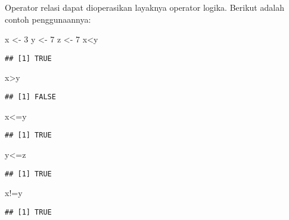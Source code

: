 \documentclass[
]{book}
\newenvironment{Shaded}{\begin{snugshade}}{\end{snugshade}}
\newcommand{\DecValTok}[1]{\textcolor[rgb]{0.00,0.00,0.81}{#1}}
\newcommand{\NormalTok}[1]{#1}
\newcommand{\OtherTok}[1]{\textcolor[rgb]{0.56,0.35,0.01}{#1}}
\newcommand{\SpecialCharTok}[1]{\textcolor[rgb]{0.00,0.00,0.00}{#1}}
\begin{document}
Operator relasi dapat dioperasikan layaknya operator logika. Berikut adalah contoh penggunaannya:

\begin{Shaded}
\begin{Highlighting}[]
\NormalTok{x }\OtherTok{\textless{}{-}} \DecValTok{3}
\NormalTok{y }\OtherTok{\textless{}{-}} \DecValTok{7}
\NormalTok{z }\OtherTok{\textless{}{-}} \DecValTok{7}
\NormalTok{x}\SpecialCharTok{\textless{}}\NormalTok{y}
\end{Highlighting}
\end{Shaded}

\begin{verbatim}
## [1] TRUE
\end{verbatim}

\begin{Shaded}
\begin{Highlighting}[]
\NormalTok{x}\SpecialCharTok{\textgreater{}}\NormalTok{y}
\end{Highlighting}
\end{Shaded}

\begin{verbatim}
## [1] FALSE
\end{verbatim}

\begin{Shaded}
\begin{Highlighting}[]
\NormalTok{x}\SpecialCharTok{\textless{}=}\NormalTok{y}
\end{Highlighting}
\end{Shaded}

\begin{verbatim}
## [1] TRUE
\end{verbatim}

\begin{Shaded}
\begin{Highlighting}[]
\NormalTok{y}\SpecialCharTok{\textless{}=}\NormalTok{z}
\end{Highlighting}
\end{Shaded}

\begin{verbatim}
## [1] TRUE
\end{verbatim}

\begin{Shaded}
\begin{Highlighting}[]
\NormalTok{x}\SpecialCharTok{!=}\NormalTok{y}
\end{Highlighting}
\end{Shaded}

\begin{verbatim}
## [1] TRUE
\end{verbatim}
\end{document}
